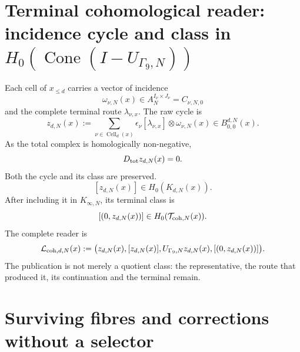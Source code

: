 \section{Terminal cohomological reader: incidence cycle and class in \(H_0(\operatorname{Cone}(I-U_{\Gamma_9,N}))\)}
\label{sec:pdfv2-coh-reader}

Each cell of \(x_{\leq d}\) carries a vector of incidence
\[
 \omega_{\nu,N}(x)
 \in A_N^{I_\nu\times J_\nu}=C_{\nu,N,0}
\]
and the complete terminal route \(\lambda_{\nu,x}\). The raw cycle is
\begin{equation}\label{eq:pdfv2-coh-z-cycle}
 z_{d,N}(x):=
 \sum_{\nu\in\operatorname{Cell}_d(x)}
 \epsilon_\nu[\lambda_{\nu,x}]
 \otimes\omega_{\nu,N}(x)
 \in B_{0,0}^{d,N}(x).
\end{equation}
As the total complex is homologically non-negative,
\begin{equation}\label{eq:pdfv2-coh-z-closed}
 D_{\rm tot}z_{d,N}(x)=0.
\end{equation}
Both the cycle and its class are preserved.
\[
 [z_{d,N}(x)]\in H_0(K_{d,N}(x)).
\]
After including it in \(K_{\infty,N}\), its terminal class is
\[
 [(0,z_{d,N}(x))]
 \in H_0(\mathcal T_{{\rm coh},N}(x)).
\]
The complete reader is
\begin{equation}\label{eq:pdfv2-coh-reader-full}
 \mathcal L_{{\rm coh},d,N}(x)
 :=\bigl(
 z_{d,N}(x),[z_{d,N}(x)],
 U_{\Gamma_9,N}z_{d,N}(x),
 [(0,z_{d,N}(x))]
 \bigr).
\end{equation}
The publication is not merely a quotient class: the representative, the route that produced it, its continuation and the terminal remain.

\section{Surviving fibres and corrections without a selector}
\label{sec:pdfv2-coh-surviving-fibers}

